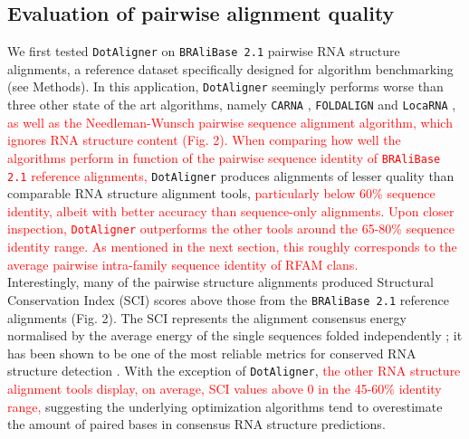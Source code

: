 \documentclass{bmcart}
\newcommand\dotaligner{\texttt{DotAligner}}
\newcommand\bralibase{\texttt{BRAliBase 2.1}}
\newcommand\locarna{\texttt{LocaRNA}}
\newcommand\foldalign{\texttt{FOLDALIGN}}
\newcommand\carna{\texttt{CARNA}}
\begin{document}
\subsection*{ Evaluation of pairwise alignment quality}

We first tested \dotaligner{} on \bralibase{} pairwise RNA structure alignments, a reference 
dataset specifically designed for algorithm benchmarking 
\cite{Gardner15860779,wilm2006enhanced} (see Methods). In this application, \dotaligner{} seemingly  
performs worse than three other state of the art algorithms, namely \carna{} \cite{Sorescu2012}, \foldalign{} \cite{havgaard2007fast,sundfeld2015foldalign} and \locarna{} \cite{Will17432929}, \textcolor{red}{ as well as the Needleman-Wunsch pairwise sequence alignment algorithm, which ignores RNA structure content (Fig. 2).
When comparing how well the algorithms perform in function of the pairwise 
sequence identity of \bralibase{} reference alignments, }
\dotaligner{} produces alignments of lesser quality than comparable 
RNA structure alignment tools,\textcolor{red}{ particularly below 60\% sequence identity, 
albeit with better accuracy than sequence-only alignments. 
Upon closer inspection, \dotaligner{} outperforms the other tools around the 65-80\%
sequence identity range. As mentioned in the next section, this roughly corresponds to the 
average pairwise intra-family sequence identity of RFAM clans.}\\

Interestingly, many of the pairwise structure alignments produced Structural 
Conservation Index (SCI) scores above those from the \bralibase{} reference alignments 
(Fig. 2). The SCI represents the alignment consensus energy normalised
 by the average energy of the single sequences folded independently \cite{washietl2005fast}; 
it has been shown to be one of the most reliable metrics for conserved RNA structure 
detection \cite{gruber2008strategies}. With the exception of \dotaligner{}, 
\textcolor{red}{
the other  RNA structure alignment tools display, on average, SCI values above 0 in the 45-60\% identity range, } 
suggesting the underlying optimization algorithms tend to overestimate the amount of paired bases in consensus RNA structure predictions.\\
\end{document}
